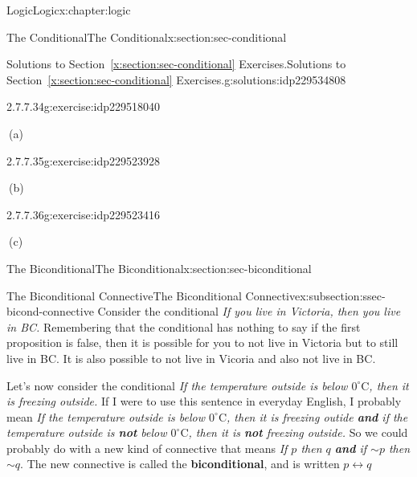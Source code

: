 \documentclass[twoside,10pt,]{book}
\newcommand{\xreffont}{\relax}
\newcommand{\alert}[1]{\textbf{\textit{#1}}}
\newcommand{\terminology}[1]{\textbf{#1}}
\numberwithin{equation}{section}
\newcommand{\biconditional}{{p {\leftrightarrow}{} q}}
\begin{document}
\begin{chapterptx}{Logic}{}{Logic}{}{}{x:chapter:logic}
\begin{sectionptx}{The Conditional}{}{The Conditional}{}{}{x:section:sec-conditional}
\begin{solutions-subsection}{Solutions to Section~{\xreffont\ref*{x:section:sec-conditional}} Exercises.}{}{Solutions to Section~{\xreffont\ref*{x:section:sec-conditional}} Exercises.}{}{}{g:solutions:idp229534808}
\begin{divisionsolution}{2.7.7.34}{}{g:exercise:idp229518040}
\par\smallskip%
\noindent\hypertarget{g:solution:idp229523800-main}{}\(\ \)(a)\end{divisionsolution}%
\begin{divisionsolution}{2.7.7.35}{}{g:exercise:idp229523928}%
\par\smallskip%
\noindent\hypertarget{g:solution:idp229526872-main}{}\(\ \)(b)\end{divisionsolution}%
\begin{divisionsolution}{2.7.7.36}{}{g:exercise:idp229523416}%
\par\smallskip%
\noindent\hypertarget{g:solution:idp229530712-main}{}\(\ \)(c)\end{divisionsolution}%
\end{solutions-subsection}
\end{sectionptx}
%
%
\typeout{************************************************}
\typeout{************************************************}
%
\begin{sectionptx}{The Biconditional}{}{The Biconditional}{}{}{x:section:sec-biconditional}
%
%
\typeout{************************************************}
\typeout{************************************************}
%
\begin{subsectionptx}{The Biconditional Connective}{}{The Biconditional Connective}{}{}{x:subsection:ssec-bicond-connective}
Consider the conditional \emph{If you live in Victoria, then you live in BC.}  Remembering that the conditional has nothing to say if the first proposition is false, then it is possible for you to not live in Victoria but to still live in BC.  It is also possible to not live in Vicoria and also not live in BC.%
\par
Let's now consider the conditional \emph{If the temperature outside is below \(0^{\circ}\text{C}\), then it is freezing outside.}  If I were to use this sentence in everyday English, I probably mean \emph{If the temperature outside is below \(0^{\circ}\text{C}\), then it is freezing outide \alert{and} if the temperature outside is \alert{not} below \(0^{\circ}\text{C}\), then it is \alert{not} freezing outside.}  So we could probably do with a new kind of connective that means \emph{If \(p\) then \(q\) \alert{and} if \(\sim\!{p}{}\) then \(\sim\!{q}{}\)}.  The new connective is called the \terminology{biconditional}, and is written \(\biconditional\)%
\par

\end{subsectionptx}
\end{sectionptx}
\end{chapterptx}
\end{document}
